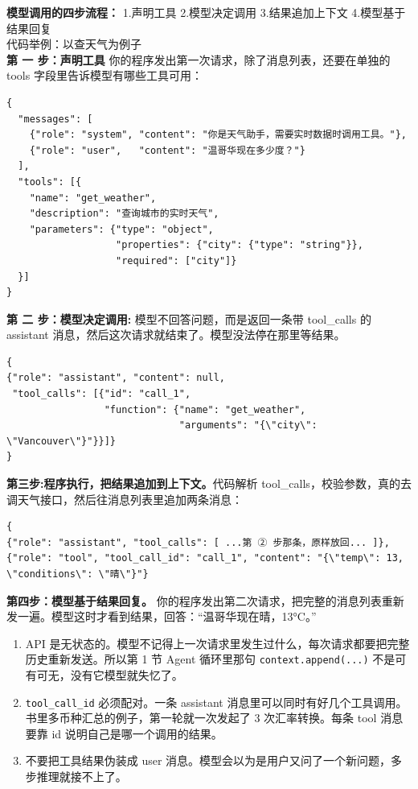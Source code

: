 \textbf{模型调用的四步流程：}
1.声明工具 2.模型决定调用 3.结果追加上下文 4.模型基于结果回复\\

代码举例：以查天气为例子\\

\textbf{第 一 步：声明工具} 你的程序发出第一次请求，除了消息列表，还要在单独的 tools 字段里告诉模型有哪些工具可用：
\begin{lstlisting}[style=agentpython]
  {
  "messages": [
    {"role": "system", "content": "你是天气助手，需要实时数据时调用工具。"},
    {"role": "user",   "content": "温哥华现在多少度？"}
  ],
  "tools": [{
    "name": "get_weather",
    "description": "查询城市的实时天气",
    "parameters": {"type": "object",
                   "properties": {"city": {"type": "string"}},
                   "required": ["city"]}
  }]
}
\end{lstlisting}
\textbf{第 二 步：模型决定调用:} 模型不回答问题，而是返回一条带 tool\_calls 的 assistant 消息，然后这次请求就结束了。模型没法停在那里等结果。

\begin{lstlisting}[style=agentpython]
{
{"role": "assistant", "content": null,
 "tool_calls": [{"id": "call_1",
                 "function": {"name": "get_weather",
                              "arguments": "{\"city\": \"Vancouver\"}"}}]}
}
\end{lstlisting}
\textbf{第三步:程序执行，把结果追加到上下文。}代码解析 tool\_calls，校验参数，真的去调天气接口，然后往消息列表里追加两条消息：
\begin{lstlisting}[style=agentpython]
{
{"role": "assistant", "tool_calls": [ ...第 ② 步那条，原样放回... ]},
{"role": "tool", "tool_call_id": "call_1", "content": "{\"temp\": 13, \"conditions\": \"晴\"}"}
\end{lstlisting}
\textbf{第四步：模型基于结果回复。} 你的程序发出第二次请求，把完整的消息列表重新发一遍。模型这时才看到结果，回答：“温哥华现在晴，13°C。”

\begin{tcolorbox}[colback=second!5, colframe=second, title=三条规则]
  \begin{enumerate}
    \item API 是无状态的。模型不记得上一次请求里发生过什么，每次请求都要把完整历史重新发送。所以第 1 节 Agent 循环里那句 \texttt{context.append(...)} 不是可有可无，没有它模型就失忆了。
    \item \texttt{tool\_call\_id} 必须配对。一条 assistant 消息里可以同时有好几个工具调用。书里多币种汇总的例子，第一轮就一次发起了 3 次汇率转换。每条 tool 消息要靠 id 说明自己是哪一个调用的结果。
    \item 不要把工具结果伪装成 user 消息。模型会以为是用户又问了一个新问题，多步推理就接不上了。
  \end{enumerate}
\end{tcolorbox}

